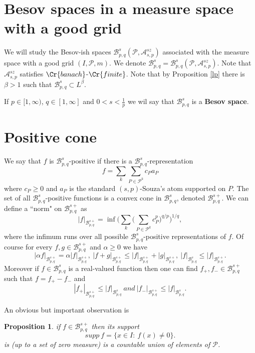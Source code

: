 \documentclass{amsart}
\newtheorem{proposition}[theorem]{Proposition}
\theoremstyle{definition}
\newcommand{\Crr}[1]{\Cr{#1}}
\begin{document}
\section{Besov spaces in a measure space with a good grid}


 We will study the Besov-ish spaces  $\mathcal{B}^s_{p,q}(\mathcal{P},\mathcal{A}^{sz}_{s,p})$ associated with the measure space with a good grid $(I, \mathcal{P},m)$. We denote  $\mathcal{B}^s_{p,q}=\mathcal{B}^s_{p,q}(\mathcal{P},\mathcal{A}^{sz}_{s,p})$. Note that $\mathcal{A}^{sz}_{s,p}$ satisfies ${\Crr{banach}}$-${\Crr{finite}}$. Note that by Proposition \ref{lp} there is $\beta > 1$ such that $\mathcal{B}^s_{p,q} \subset L^\beta$.
 
If  $p\in [1,\infty)$, $q\in [1,\infty]$ and  $0< s< \frac{1}{p}$ we wil say that  $\mathcal{B}^s_{p,q}$ is a   {\bf Besov space}. 


\section{Positive cone}

We say that $f$ is $\mathcal{B}^s_{p,q}$-positive if there is a $\mathcal{B}^s_{p,q}$-representation
$$f= \sum_k \sum_{P\in \mathcal{P}^k} c_Pa_P$$
where $c_P\geq 0$ and $a_P$ is the standard $(s,p)$-Souza's atom supported on $P$. The set of all $\mathcal{B}^s_{p,q}$-positive functions is a convex cone in $\mathcal{B}^s_{p,q}$, denoted $\mathcal{B}^{s+}_{p,q}$. We can define a ``norm" on $\mathcal{B}^{s+}_{p,q}$ as
$$|f|_{\mathcal{B}^{s+}_{p,q}}=\inf   \Big( \sum_k \big( \sum_{P\in \mathcal{P}^k}  c_P^p \big)^{q/p} \Big)^{1/q},$$
where the infimum runs over all possible $\mathcal{B}^s_{p,q}$-positive representations of $f$. Of course for every $f,g \in \mathcal{B}^{s+}_{p,q}$ and $\alpha \geq 0$ we have 
$$|\alpha f|_{\mathcal{B}^{s+}_{p,q}}=\alpha  | f|_{\mathcal{B}^{s+}_{p,q}}, \ |f+g|_{\mathcal{B}^{s+}_{p,q}}\leq  |f|_{\mathcal{B}^{s+}_{p,q}}+  |g|_{\mathcal{B}^{s+}_{p,q}}, \   | f|_{\mathcal{B}^{s}_{p,q}} \leq | f|_{\mathcal{B}^{s+}_{p,q}}.$$
Moreover if $f\in \mathcal{B}^s_{p,q}$   is a real-valued function then one can find $f_+,f_-\in \mathcal{B}^{s+}_{p,q}$ such that $f=f_+-f_-$ and $$|f_+|_{\mathcal{B}^{s+}_{p,q}} \leq |f|_{\mathcal{B}^{s}_{p,q}} \ and \  |f_-|_{\mathcal{B}^{s+}_{p,q}} \leq |f|_{\mathcal{B}^{s}_{p,q}}.$$

An obvious but important observation is

\begin{proposition} if $f \in \mathcal{B}^{s+}_{p,q}$ then its support    
$$supp \ f = \{ x\in I\colon \ f(x)\neq 0\}.$$
is (up to a set of zero measure) is a countable union of elements of $\mathcal{P}$. 
\end{proposition} 
\end{document}
